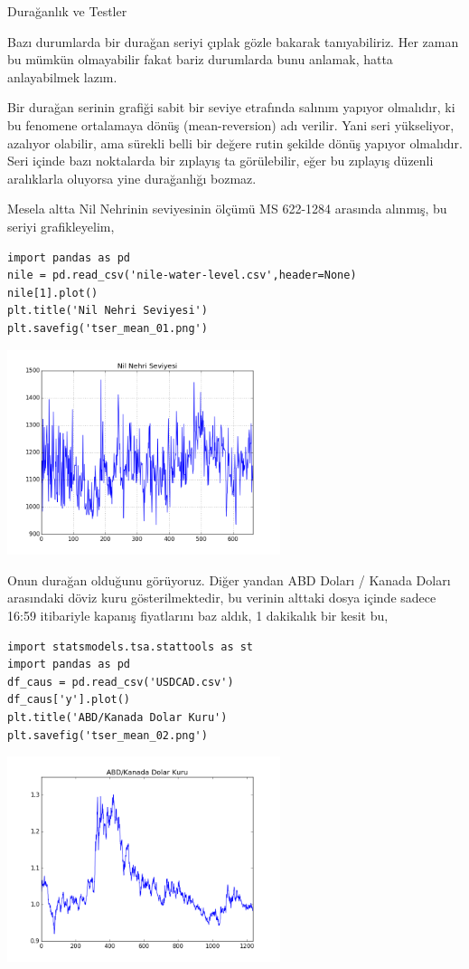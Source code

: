 \documentclass[12pt,fleqn]{article}\usepackage{../../common}
\begin{document}
Durağanlık ve Testler

Bazı durumlarda bir durağan seriyi çıplak gözle bakarak tanıyabiliriz. Her
zaman bu mümkün olmayabilir fakat bariz durumlarda bunu anlamak, hatta
anlayabilmek lazım. 

Bir durağan serinin grafiği sabit bir seviye etrafında salınım yapıyor
olmalıdır, ki bu fenomene ortalamaya dönüş (mean-reversion) adı
verilir. Yani seri yükseliyor, azalıyor olabilir, ama sürekli belli bir
değere rutin şekilde dönüş yapıyor olmalıdır. Seri içinde bazı noktalarda
bir zıplayış ta görülebilir, eğer bu zıplayış düzenli aralıklarla oluyorsa
yine durağanlığı bozmaz. 

Mesela altta Nil Nehrinin seviyesinin ölçümü MS 622-1284 arasında
alınmış, bu seriyi grafikleyelim,

\begin{verbatim}
import pandas as pd
nile = pd.read_csv('nile-water-level.csv',header=None)
nile[1].plot()
plt.title('Nil Nehri Seviyesi')
plt.savefig('tser_mean_01.png')
\end{verbatim}

\includegraphics[height=6cm]{tser_mean_01.png}

Onun durağan olduğunu görüyoruz. Diğer yandan ABD Doları / Kanada Doları
arasındaki döviz kuru gösterilmektedir, bu verinin alttaki dosya içinde
sadece 16:59 itibariyle kapanış fiyatlarını baz aldık, 1 dakikalık bir
kesit bu, 

\begin{verbatim}
import statsmodels.tsa.stattools as st
import pandas as pd
df_caus = pd.read_csv('USDCAD.csv')
df_caus['y'].plot()
plt.title('ABD/Kanada Dolar Kuru')
plt.savefig('tser_mean_02.png')
\end{verbatim}

\includegraphics[height=6cm]{tser_mean_02.png}
\end{document}
